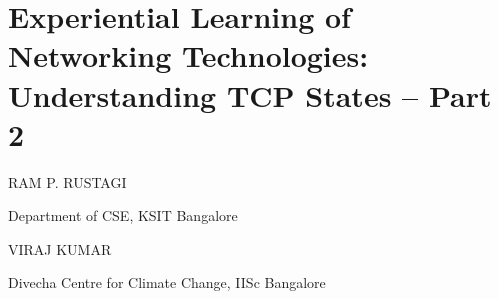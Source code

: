 \chapter{Experiential Learning of Networking Technologies: Understanding TCP States -- Part 2}

\begin{center}
\uppercase{Ram P. Rustagi}

\vskip -7pt

Department of CSE, KSIT Bangalore

\bigskip

\uppercase {Viraj Kumar}

\vskip -7pt

Divecha Centre for Climate Change, IISc Bangalore
\end{center}

\noindent{}

\newpage

